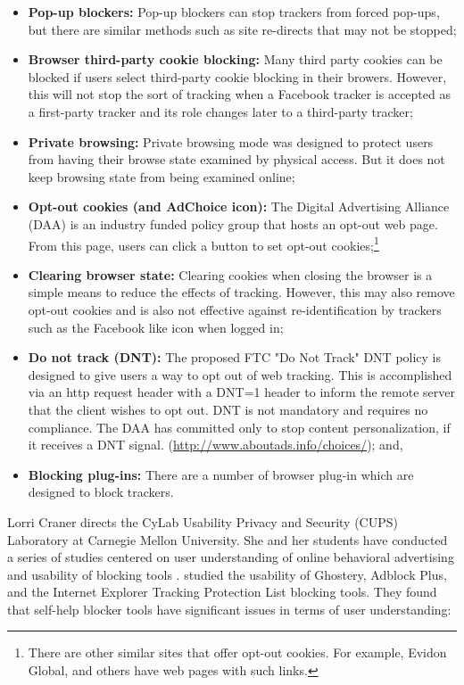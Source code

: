 \begin{itemize}
\item \textbf{Pop-up blockers:} Pop-up blockers can stop trackers from forced pop-ups, but there are similar methods such as site re-directs that may not be stopped;
\item \textbf{Browser third-party cookie blocking:} Many third party cookies can be blocked if users select third-party cookie blocking in their browers. However, this will not stop the sort of tracking when a Facebook tracker is accepted as a first-party tracker and its role changes later to a third-party tracker; 
\item \textbf{Private browsing:} Private browsing mode was designed to protect users from having their browse state examined by physical access. But it does not keep browsing state from being examined online;
\item \textbf{Opt-out cookies (and AdChoice icon):} The Digital Advertising Alliance (DAA) is an industry funded policy group that hosts an opt-out web page. From this page, users can click a button to set opt-out cookies;\footnote{There are other similar sites that offer opt-out cookies. For example, Evidon Global, and others have web pages with such links.}
\item \textbf{Clearing browser state:} Clearing cookies when closing the browser is a simple means to reduce the effects of tracking. However, this may also remove opt-out cookies and is also not effective against re-identification by trackers such as the Facebook like icon when logged in;
\item \textbf{Do not track (DNT):} The proposed FTC "Do Not Track" DNT policy is designed to give users a way to opt out of web tracking. This is accomplished via an http request header with a DNT=1 header to inform the remote server that the client wishes to opt out. DNT is not mandatory and requires no compliance. The DAA has committed only to stop content personalization, if it receives a DNT signal. (\url{http://www.aboutads.info/choices/}); and,
\item \textbf{Blocking plug-ins:}  There are a number of browser plug-in which are designed to block trackers.
\end{itemize}

Lorri Craner directs the CyLab Usability Privacy and Security (CUPS) Laboratory at Carnegie Mellon University. She and her students have conducted a series of studies centered on user understanding of online behavioral advertising and usability of blocking tools  \citep{McDonald:2010vv,Ur:2012ws,Leon:2012vu,Cranor:2012ui}. \cite{Leon:2012vu}  studied the usability of Ghostery, Adblock Plus, and the Internet Explorer Tracking Protection List blocking tools. They found that self-help blocker tools have significant issues in terms of user understanding:

